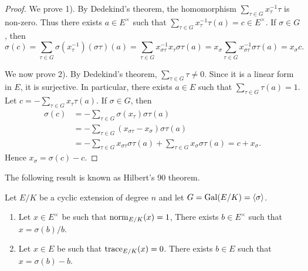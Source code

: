 \begin{proof}
    We prove 1). By Dedekind's theorem, the homomorphism 
    $\sum_{\tau\in G}x_{\tau}^{-1}\tau$ is non-zero. Thus there exists
    $a\in E^{\times}$ such that $\sum_{\tau\in G}x_{\tau}^{-1}\tau(a)=c\in E^{\times}$. 
    If $\sigma\in G$, 
    then 
    \[
    \sigma(c)=\sum_{\tau\in G}\sigma(x_{\tau}^{-1})(\sigma\tau)(a)=
    \sum_{\tau\in G}x_{\sigma\tau}^{-1}x_{\tau}\sigma\tau(a)
    =x_{\sigma}\sum_{\tau\in G}x_{\sigma\tau}^{-1}\sigma\tau(a)=x_{\sigma}c.
    \]
    
    We now prove 2). By Dedekind's theorem, $\sum_{\tau\in G}\tau\ne0$. Since
    it is a linear form in $E$, it is surjective. In particular, there exists 
    $a\in E$ such that $\sum_{\tau\in G}\tau(a)=1$. Let $c=-\sum_{\tau\in G}x_\tau\tau(a)$. 
    If $\sigma\in G$, then 
    \begin{align*}
        \sigma(c) &= -\sum_{\tau\in G}\sigma(x_{\tau})\sigma\tau(a)\\
        &=-\sum_{\tau\in G}(x_{\sigma\tau}-x_{\sigma})\sigma\tau(a)\\
        &=-\sum_{\tau\in G}x_{\sigma\tau}\sigma\tau(a)+\sum_{\tau\in G}x_{\sigma}\sigma\tau(a)
        =c+x_{\sigma}.
    \end{align*}
    Hence $x_{\sigma}=\sigma(c)-c$. 
\end{proof}

The following result is known as Hilbert's 90 theorem. 

\begin{theorem}[Hilbert]
    Let $E/K$ be a cyclic extension of degree $n$ and let $G=\operatorname{Gal}(E/K)=\langle\sigma\rangle$. 
    \begin{enumerate}
        \item Let $x\in E^{\times}$ be such that $\operatorname{norm}_{E/K}(x)=1$, 
        There exists $b\in E^{\times}$ such that $x=\sigma(b)/b$. 
        \item Let  $x\in E$ be such that $\operatorname{trace}_{E/K}(x)=0$. 
        There exists $b\in E$ such that $x=\sigma(b)-b$. 
    \end{enumerate}
\end{theorem}

